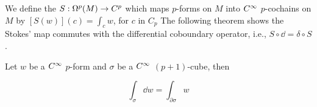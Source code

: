 \documentclass[../main]{subfiles}
\begin{document}
We define the  $S: \formbundle{M}{p} \rightarrow C^p$ which maps $p$-forms on $M$ into $\CInfty$ $p$-cochains on $M$ by $[S(w)](c)=\int_c w$, for $c$ in $C_{p}$ The following theorem shows the Stokes' map commutes with the differential coboundary operator, i.e., $S \circ \dd = \delta \circ S$.



\begin{theorem} \label{thm:ch7.5.1}
Let $w$ be a $\CInfty$ $p$-form and $\sigma$ be a $\CInfty$ $(p + 1)$-cube, then

\begin{equation}\tag{18}\label{eq:ch07.18}
\int_{\sigma} \dd w=\int_{\partial \sigma} w
\end{equation}
\end{theorem}
\end{document}
